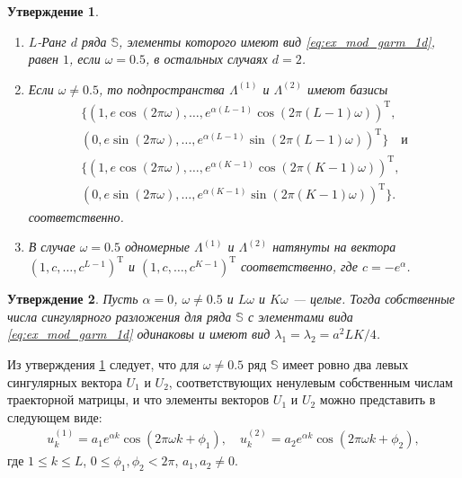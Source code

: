 \documentclass[specialist,
               substylefile = spbu.rtx,
               subf,href,colorlinks=true, 12pt]{disser}
\newtheorem{Th}{Утверждение}
\begin{document}
\begin{Th} \cite[Утверждение 1]{Zhornikova2016} \label{th:ex_mod_1d} 
\begin{enumerate}
\item $L$-Ранг $d$ ряда $\mathbb{S}$, элементы которого имеют вид \eqref{eq:ex_mod_garm_1d},  равен $1$, если $\omega = 0.5$, в остальных случаях $d=2$.
\item Если $\omega \not = 0.5$, то подпространства $\Lambda^{(1)}$ и $\Lambda^{(2)}$ имеют базисы \\
\begin{gather*}
\{(1, e\cos(2\pi\omega),\ldots,e^{\alpha (L-1)}\cos(2\pi (L-1) \omega))^\mathrm{T}, \\
(0, e\sin(2\pi\omega),\ldots,e^{\alpha (L-1)}\sin(2\pi (L-1) \omega))^\mathrm{T}\} \quad \text{и} \\ 
\{(1, e\cos(2\pi\omega),\ldots,e^{\alpha (K-1)}\cos(2\pi (K-1) \omega))^\mathrm{T}, \\
(0, e\sin(2\pi\omega),\ldots,e^{\alpha (K-1)}\sin(2\pi (K-1) \omega))^\mathrm{T}\}.
\end{gather*}
соответственно.
\item В случае $\omega = 0.5$ одномерные $\Lambda^{(1)}$ и $\Lambda^{(2)}$ натянуты на вектора \\ $(1,c,\ldots,c^{L-1})^{\mathrm{T}}$ и $(1,c,\ldots,c^{K-1})^{\mathrm{T}}$ соответственно, где $c = -e^{\alpha}$.
\end{enumerate}
\end{Th}

\begin{Th} \cite[Предложение 2.3]{Golyandina.etal2003} \label{th:1dssa_num}
Пусть $\alpha = 0$, $\omega \not = 0.5$ и $L\omega$  и $K\omega$ --- целые. Тогда собственные числа сингулярного разложения для ряда $\mathbb{S}$ с элементами вида \eqref{eq:ex_mod_garm_1d} одинаковы и имеют вид $\lambda_1=\lambda_2=a^2LK/4$.
\end{Th}

Из утверждения \ref{th:ex_mod_1d} следует, что для $\omega \not = 0.5$ ряд $\mathbb{S}$ имеет ровно два левых сингулярных вектора $U_1$ и $U_2$, соответствующих ненулевым собственным числам траекторной матрицы, 
и что элементы векторов $U_1$ и $U_2$ можно представить в следующем виде:
\begin{gather} \label{eq:vectors_ex_mod_1d} 
	u_k^{(1)} = a_1 e^{\alpha k} \cos(2\pi\omega k + \phi_1), \quad u_k^{(2)} = a_2 e^{\alpha k}\cos(2\pi\omega k + \phi_2), 
\end{gather}
где $1 \leqslant k \leqslant L$, $0 \leqslant \phi_1, \phi_2 < 2\pi$, $a_1, a_2 \not = 0$.
\end{document}
